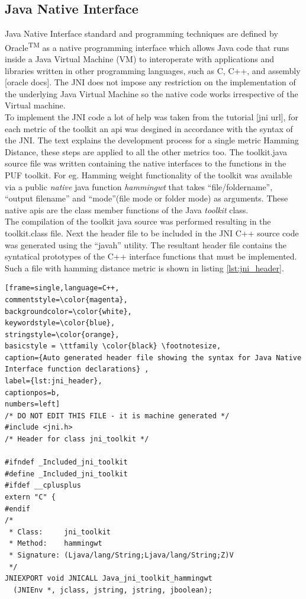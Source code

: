 \subsection{Java Native Interface}
Java Native Interface standard and programming techniques are defined by Oracle\textsuperscript{TM} as a native programming interface which allows Java code that runs inside a Java Virtual Machine (VM) to interoperate with applications and libraries written in other programming languages, such as C, C++, and assembly [oracle docs]. The JNI does not impose any restriction on the implementation of the underlying Java Virtual Machine so the native code works irrespective of the Virtual machine.\\

To implement the JNI code a lot of help was taken from the tutorial [jni url], for each metric of the toolkit an api was desgined in accordance with the syntax of the JNI. The text explains the development process for a single metric Hamming Distance, these steps are applied to all the other metrics too. The toolkit.java source file was written containing the native interfaces to the functions in the PUF toolkit. For eg. Hamming weight functionality of the toolkit was available via a public \emph{native} java function \emph{hammingwt} that takes ``file/foldername'', ``output filename'' and ``mode''(file mode or folder mode) as arguments.  These native apis are the class member functions of the Java \emph{toolkit} class.\\

The compilation of the toolkit java source was performed resulting in the toolkit.class file. Next the header file to be included in the JNI C++ source code was generated using the ``javah'' utility. The resultant header file contains the syntatical prototypes of the C++ interface functions that must be implemented. Such a file with hamming distance metric is shown in listing \ref{lst:jni_header}.
\begin{lstlisting}[frame=single,language=C++,
commentstyle=\color{magenta},
backgroundcolor=\color{white},
keywordstyle=\color{blue},
stringstyle=\color{orange},
basicstyle = \ttfamily \color{black} \footnotesize,
caption={Auto generated header file showing the syntax for Java Native Interface function declarations} ,
label={lst:jni_header},
captionpos=b,
numbers=left]
/* DO NOT EDIT THIS FILE - it is machine generated */
#include <jni.h>
/* Header for class jni_toolkit */

#ifndef _Included_jni_toolkit
#define _Included_jni_toolkit
#ifdef __cplusplus
extern "C" {
#endif
/*
 * Class:     jni_toolkit
 * Method:    hammingwt
 * Signature: (Ljava/lang/String;Ljava/lang/String;Z)V
 */
JNIEXPORT void JNICALL Java_jni_toolkit_hammingwt
  (JNIEnv *, jclass, jstring, jstring, jboolean);
\end{lstlisting}


